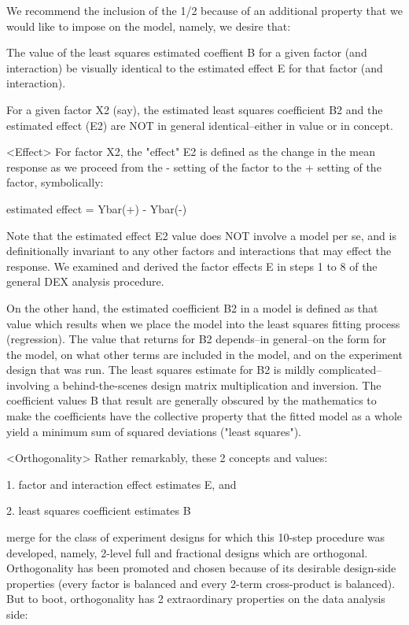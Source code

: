 We recommend the inclusion of the 1/2 because of
an additional property that we would like to
impose on the model, namely, we desire that:

   The value of the least squares estimated
   coeffient B for a given factor (and
   interaction) be visually identical to the
   estimated effect E for that factor (and
   interaction).

For a given factor X2 (say), the estimated least
squares coefficient B2 and the estimated effect
(E2) are NOT in general identical--either in value
or in concept.

<Effect>
For factor X2, the "effect" E2 is defined as the
change in the mean response as we proceed from the
- setting of the factor to the + setting of the
factor, symbolically:

   estimated effect = Ybar(+) - Ybar(-)

Note that the estimated effect E2 value does NOT
involve a model per se, and is definitionally
invariant to any other factors and interactions
that may effect the response.  We examined and
derived the factor effects E in steps 1 to 8 of
the general DEX analysis procedure.

On the other hand, the estimated coefficient B2 in
a model is defined as that value which results
when we place the model into the least squares
fitting process (regression).  The value that
returns for B2 depends--in general--on the form
for the model, on what other terms are included in
the model, and on the experiment design that was
run.  The least squares estimate for B2 is mildly
complicated--involving a behind-the-scenes design
matrix multiplication and inversion.  The
coefficient values B that result are generally
obscured by the mathematics to make the
coefficients have the collective property that the
fitted model as a whole yield a minimum sum of
squared deviations ("least squares").

<Orthogonality>
Rather remarkably, these 2 concepts and values:

   1. factor and interaction effect estimates E, and

   2. least squares coefficient estimates B

merge for the class of experiment designs for
which this 10-step procedure was developed,
namely, 2-level full and fractional designs which
are orthogonal.  Orthogonality has been promoted
and chosen because of its desirable design-side
properties (every factor is balanced and every
2-term cross-product is balanced).  But to boot,
orthogonality has 2 extraordinary properties on
the data analysis side:

